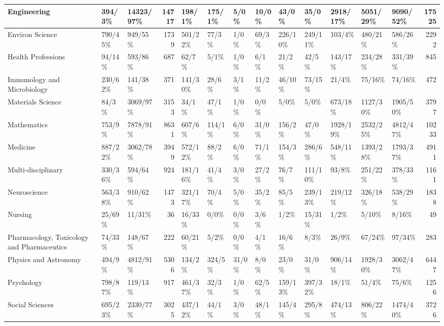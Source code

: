 \documentclass[AMA,STIX1COL]{WileyNJD-v2}
\begin{document}
\begin{table}
{\begin{tabular}{p{}|l|p{}|r||l|l|l|l|l|l|l|l|l|r}
\hline
Engineering & 394/3\% & 14323/97\% & 14717 & 198/1\% & 175/1\% & 5/0\% & 10/0\% & 43/0\% & 35/0\% & 2918/17\% & 5051/29\% & 9090/52\% & 17525\\
\hline
Environ Science & 790/45\% & 949/55\% & 1739 & 501/22\% & 77/3\% & 1/0\% & 69/3\% & 226/10\% & 249/11\% & 103/4\% & 480/21\% & 586/26\% & 2292\\
\hline
Health Professions & 94/14\% & 593/86\% & 687 & 62/7\% & 5/1\% & 1/0\% & 6/1\% & 21/2\% & 42/5\% & 143/17\% & 234/28\% & 331/39\% & 845\\
\hline
Immunology and Microbiology & 230/62\% & 141/38\% & 371 & 141/30\% & 28/6\% & 3/1\% & 11/2\% & 46/10\% & 73/15\% & 21/4\% & 75/16\% & 74/16\% & 472\\
\hline
Materials Science & 84/3\% & 3069/97\% & 3153 & 34/1\% & 47/1\% & 1/0\% & 0/0\% & 5/0\% & 5/0\% & 673/18\% & 1127/30\% & 1905/50\% & 3797\\
\hline
Mathematics & 753/9\% & 7878/91\% & 8631 & 607/6\% & 114/1\% & 6/0\% & 31/0\% & 156/2\% & 47/0\% & 1928/19\% & 2532/25\% & 4812/47\% & 10233\\
\hline
Medicine & 887/22\% & 3062/78\% & 3949 & 572/12\% & 88/2\% & 6/0\% & 71/1\% & 154/3\% & 286/6\% & 548/11\% & 1393/28\% & 1793/37\% & 4911\\
\hline
Multi-disciplinary & 330/36\% & 594/64\% & 924 & 181/16\% & 41/4\% & 3/0\% & 27/2\% & 76/7\% & 111/10\% & 93/8\% & 251/22\% & 378/33\% & 1161\\
\hline
Neuroscience & 563/38\% & 910/62\% & 1473 & 321/17\% & 70/4\% & 5/0\% & 35/2\% & 85/5\% & 239/13\% & 219/12\% & 326/18\% & 538/29\% & 1838\\
\hline
Nursing & 25/69\% & 11/31\% & 36 & 16/33\% & 0/0\% & 0/0\% & 3/6\% & 1/2\% & 15/31\% & 1/2\% & 5/10\% & 8/16\% & 49\\
\hline
Pharmacology, Toxicology and Pharmaceutics & 74/33\% & 148/67\% & 222 & 60/21\% & 5/2\% & 0/0\% & 4/1\% & 16/6\% & 8/3\% & 26/9\% & 67/24\% & 97/34\% & 283\\
\hline
Physics and Astronomy & 494/9\% & 4812/91\% & 5306 & 134/2\% & 324/5\% & 31/0\% & 8/0\% & 23/0\% & 31/0\% & 906/14\% & 1928/30\% & 3062/47\% & 6447\\
\hline
Psychology & 798/87\% & 119/13\% & 917 & 461/37\% & 32/3\% & 1/0\% & 62/5\% & 159/13\% & 397/32\% & 18/1\% & 51/4\% & 75/6\% & 1256\\
\hline
Social Sciences & 695/23\% & 2330/77\% & 3025 & 437/12\% & 44/1\% & 3/0\% & 48/1\% & 145/4\% & 295/8\% & 474/13\% & 806/22\% & 1474/40\% & 3726\\

\end{tabular}}
\end{table}
\end{document}
